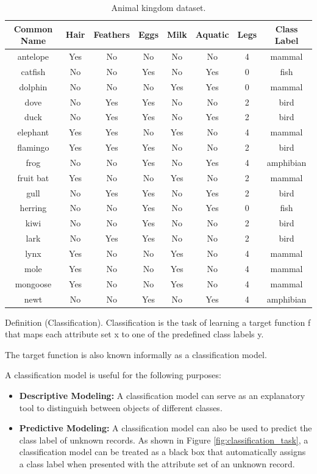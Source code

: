 \begin{table}[!htp]
\centering
\begin{tabular}{ |c|c|c|c|c|c|c|c| }
\hline
Common Name & Hair & Feathers & Eggs & Milk & Aquatic & Legs & Class Label \\ \hline
antelope & Yes & No & No & No & No & 4 & mammal \\ \hline
catfish & No & No & Yes & No & Yes & 0 & fish \\ \hline
dolphin & No & No & No & Yes & Yes & 0 & mammal \\ \hline
dove & No & Yes & Yes & No & No & 2 & bird \\ \hline
duck & No & Yes & Yes & No & Yes & 2 & bird \\ \hline
elephant & Yes & Yes & No & Yes & No & 4 & mammal \\ \hline
flamingo & Yes & Yes & Yes & No & No & 2 & bird \\ \hline
frog & No & No & Yes & No & Yes & 4 & amphibian \\ \hline
fruit bat & Yes & No & No & Yes & No & 2 & mammal \\ \hline
gull & No & Yes & Yes & No & Yes & 2 & bird \\ \hline
herring & No & No & Yes & No & Yes & 0 & fish \\ \hline
kiwi & No & No & Yes & No & No & 2 & bird \\ \hline
lark & No & Yes & Yes & No & No & 2 & bird \\ \hline
lynx & Yes & No & No & Yes & No & 4 & mammal \\ \hline
mole & Yes & No & No & Yes & No & 4 & mammal \\ \hline
mongoose & Yes & No & No & Yes & No & 4 & mammal \\ \hline
newt & No & No & Yes & No & Yes & 4 & amphibian \\ \hline
\end{tabular}
\label{tab:clasiffication_table}
\caption{Animal kingdom dataset.}
\end{table}

Definition (Classification). Classification is the task of learning a target function f that maps each attribute set x to one of the predefined class labels y.

The target function is also known informally as a classification model.

A classification model is useful for the following purposes:

\begin{itemize}
\item \textbf{Descriptive Modeling:} A classification model can serve as an explanatory tool to distinguish between objects of different classes.

\item \textbf{Predictive Modeling:} A classification model can also be used to predict the class label of unknown records. As shown in Figure \ref{fig:classification_task}, a classification model can be treated as a black box that automatically assigns a class label when presented with the attribute set of an unknown record.
\end{itemize}

